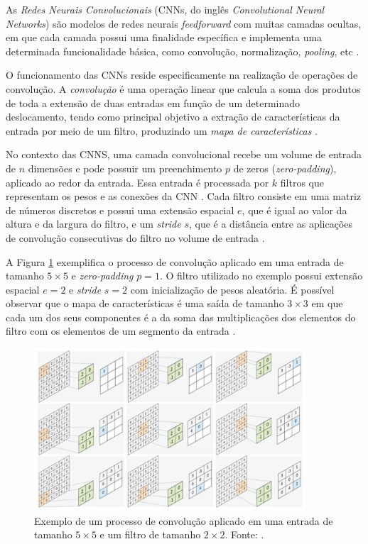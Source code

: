 As \textit{Redes Neurais Convolucionais} (CNNs, do inglês \textit{Convolutional Neural Networks}) são modelos de redes neurais \emph{feedforward} com muitas camadas ocultas, em que cada camada possui uma finalidade específica e implementa uma determinada funcionalidade básica, como convolução, normalização, \textit{pooling}, etc \cite{ref:goodfellow,ref:khan}.

O funcionamento das CNNs reside especificamente na realização de operações de convolução. A \textit{convolução} é uma operação linear que calcula a soma dos produtos de toda a extensão de duas entradas em função de um determinado deslocamento, tendo como principal objetivo a extração de características da entrada por meio de um filtro, produzindo um  \textit{mapa de características} \cite{ref:goodfellow,ref:sewak}.

No contexto das CNNS, uma camada convolucional recebe um volume de entrada de $n$ dimensões e pode possuir um preenchimento  $p$ de zeros (\textit{zero-padding}), aplicado ao redor da entrada. Essa entrada é processada por $k$ filtros que representam os pesos e as conexões da CNN \cite{ref:khan}. Cada filtro consiste em uma matriz de números discretos e possui uma extensão espacial $e$, que é igual ao valor da altura e da largura do filtro, e um \textit{stride} $s$, que é a distância entre as aplicações de convolução consecutivas do filtro no volume de entrada \cite{ref:buduma}.

A Figura \ref{img:convolucao} exemplifica o processo de convolução aplicado em uma entrada de tamanho $5\times 5$ e \textit{zero-padding} $p = 1$. O filtro utilizado no exemplo possui extensão espacial $e = 2$ e \textit{stride} $s = 2$ com inicialização de pesos aleatória. É possível observar que o mapa de características é uma saída de tamanho $3\times 3$ em que cada um dos seus componentes é a da soma das multiplicações dos elementos do filtro com os elementos de um segmento da entrada \cite{ref:khan}.

\begin{figure}[!ht]
	\centering
  \caption{Exemplo de um processo de convolução aplicado em uma entrada de tamanho $5\times 5$ e um filtro de tamanho $2\times 2$. Fonte: \cite{ref:khan}.}
  \label{img:convolucao}
	\includegraphics[width=0.9\textwidth]{./img/convolucao}
\end{figure}

